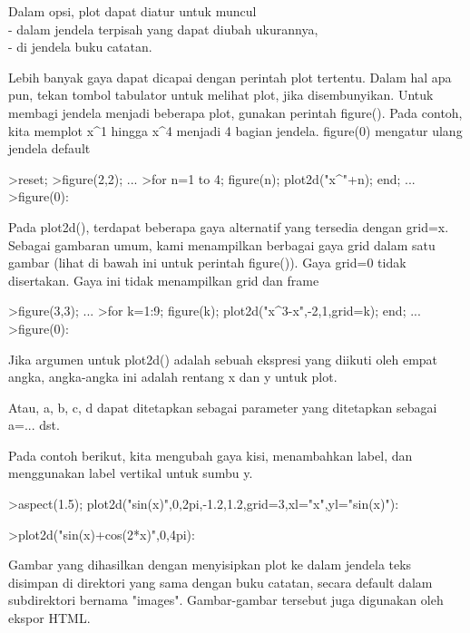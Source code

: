 \documentclass[a4paper,10pt]{article}
\begin{document}
\begin{eulernotebook}
\begin{eulercomment}
\begin{eulercomment}
\begin{eulercomment}
Dalam opsi, plot dapat diatur untuk muncul \\
- dalam jendela terpisah yang dapat diubah ukurannya, \\
- di jendela buku catatan. 

Lebih banyak gaya dapat dicapai dengan perintah plot tertentu. Dalam
hal apa pun, tekan tombol tabulator untuk melihat plot, jika
disembunyikan. Untuk membagi jendela menjadi beberapa plot, gunakan
perintah figure(). Pada contoh, kita memplot x\textasciicircum{}1 hingga x\textasciicircum{}4 menjadi 4
bagian jendela. figure(0) mengatur ulang jendela default
\end{eulercomment}
\begin{eulerprompt}
>reset;
>figure(2,2); ...
>for n=1 to 4; figure(n); plot2d("x^"+n); end; ...
>figure(0):
\end{eulerprompt}
\begin{eulercomment}
Pada plot2d(), terdapat beberapa gaya alternatif yang tersedia dengan
grid=x. Sebagai gambaran umum, kami menampilkan berbagai gaya grid
dalam satu gambar (lihat di bawah ini untuk perintah figure()). Gaya
grid=0 tidak disertakan. Gaya ini tidak menampilkan grid dan frame
\end{eulercomment}
\begin{eulerprompt}
>figure(3,3); ...
>for k=1:9; figure(k); plot2d("x^3-x",-2,1,grid=k); end; ...
>figure(0):
\end{eulerprompt}
\begin{eulercomment}
Jika argumen untuk plot2d() adalah sebuah ekspresi yang diikuti oleh
empat angka, angka-angka ini adalah rentang x dan y untuk plot. 

Atau, a, b, c, d dapat ditetapkan sebagai parameter yang ditetapkan
sebagai a=... dst. 

Pada contoh berikut, kita mengubah gaya kisi, menambahkan label, dan
menggunakan label vertikal untuk sumbu y.
\end{eulercomment}
\begin{eulerprompt}
>aspect(1.5); plot2d("sin(x)",0,2pi,-1.2,1.2,grid=3,xl="x",yl="sin(x)"):
\end{eulerprompt}
\begin{eulerprompt}
>plot2d("sin(x)+cos(2*x)",0,4pi):
\end{eulerprompt}
\begin{eulercomment}
Gambar yang dihasilkan dengan menyisipkan plot ke dalam jendela teks
disimpan di direktori yang sama dengan buku catatan, secara default
dalam subdirektori bernama "images". Gambar-gambar tersebut juga
digunakan oleh ekspor HTML. 


\end{eulercomment}
\end{eulercomment}
\end{eulercomment}
\end{eulernotebook}
\end{document}
